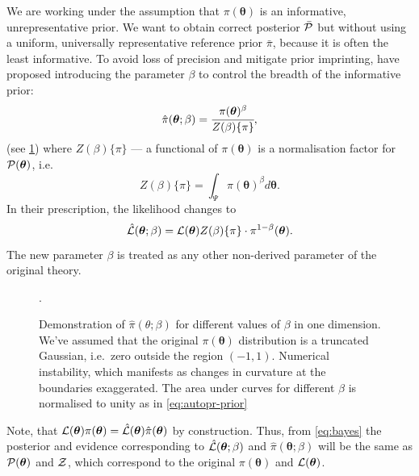 \documentclass[draft,usenatbib]{mnras}
\begin{document}
We are working under the assumption that \(\pi(\bm{\theta})\) is an
informative, unrepresentative prior. We want to obtain correct
posterior \(\bar{\cal P}\) but without using a uniform, universally
representative reference prior \(\bar{\pi}\), because it is often the
least informative. To avoid loss of precision and mitigate prior
imprinting, \cite{chen-ferroz-hobson} have proposed introducing the
parameter \(\beta\) to control the breadth of the informative prior:
\begin{equation}
\label{eq:autopr-prior}
\hat{\pi}(\bm{\bm{\theta}};\beta) = \cfrac{\pi(\bm{\theta})^{\beta}}{Z(\beta)\{\pi\}},
\end{equation}
(see \cref{fig:ppr}) where \(Z(\beta)\{\pi\}\) --- a functional of
\(\pi (\bm{\theta})\) is a normalisation factor for \({\cal P}
   (\bm{\theta})\), i.e.
\begin{equation}
Z(\beta)\{\pi\} = \int_{\Psi} \pi(\bm{\bm{\theta}})^{\beta}d\bm{\bm{\theta}}.
\end{equation}
In their prescription, the likelihood changes to
\begin{equation}
\hat{\cal L}(\bm{\theta}; \beta) = {\cal L}(\bm{\theta}) Z(\beta)\{\pi\} \cdot \pi^{1-\beta}(\bm{\theta}).
\end{equation}
The new parameter \(\beta\) is treated as any other non-derived
parameter of the original theory.
\begin{figure}

\caption{\label{fig:ppr} Demonstration of
 \(\hat{\pi}(\theta; \beta)\) for different values of \(\beta\) in
one dimension. We've assumed that the original
\( \pi (\bm{\theta})\) distribution is a truncated Gaussian,
i.e.~zero outside the region \((-1, 1)\). Numerical instability,
which manifests as changes in curvature at the boundaries
exaggerated. The area under curves for different $\beta$ is
normalised to unity as in \cref{eq:autopr-prior}}.  
\end{figure}


Note, that
\({\cal L}(\bm{\theta})\pi (\bm{\theta}) = \hat{\cal L}(\bm{\theta})
   \hat{\pi} (\bm{\theta})\) by construction. Thus, from \cref{eq:bayes}
the posterior and evidence corresponding to
\(\hat{\cal L}(\bm{\theta};\beta)\) and
\(\hat{\pi} (\bm{\theta};\beta)\) will be the same as
\({\cal P} (\bm{\theta})\) and \({\cal Z}\), which correspond to the
original \(\pi(\bm{\theta})\) and \({\cal L}(\bm{\theta})\).
\end{document}
